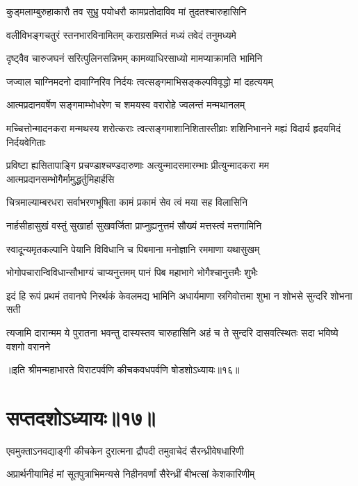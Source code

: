 \twolineshloka
{कुड्मलाम्बुरुहाकारौ तव सुभ्रु पयोधरौ}
{कामप्रतोदाविव मां तुदतश्चारुहासिनि}


\twolineshloka
{वलीविभङ्गचतुरं स्तनभारविनामितम्}
{कराग्रसम्मितं मध्यं तवेदं तनुमध्यमे}


\twolineshloka
{दृष्ट्वैव चारुजघनं सरित्पुलिनसन्निभम्}
{कामव्याधिरसाध्यो मामप्याक्रामति भामिनि}


\twolineshloka
{जज्वाल चाग्निमदनो दावाग्निरिव निर्दयः}
{त्वत्सङ्गमाभिसङ्कल्पविवृद्धो मां दहत्ययम्}


\twolineshloka
{आत्मप्रदानवर्षेण सङ्गमाम्भोधरेण च}
{शमयस्व वरारोहे ज्वलन्तं मन्मथानलम्}


\threelineshloka
{मच्चित्तोन्मादनकरा मन्मथस्य शरोत्कराः}
{त्वत्सङ्गमाशानिशितास्तीव्राः शशिनिभानने}
{मह्यं विदार्य हृदयमिदं निर्दयवेगिताः}


\threelineshloka
{प्रविष्टा ह्यसितापाङ्गि प्रचण्डाश्चण्डदारुणाः}
{अत्युन्मादसमारम्भाः प्रीत्युन्मादकरा मम}
{आत्मप्रदानसम्भोगैर्मामुद्धर्तुमिहार्हसि}


\twolineshloka
{चित्रमाल्याम्बरधरा सर्वाभरणभूषिता}
{कामं प्रकामं सेव त्वं मया सह विलासिनि}


\twolineshloka
{नार्हसीहासुखं वस्तुं सुखार्हा सुखवर्जिता}
{प्राप्नुह्यनुत्तमं सौख्यं मत्तस्त्वं मत्तगामिनि}


\twolineshloka
{स्वादून्यमृतकल्पानि पेयानि विविधानि च}
{पिबमाना मनोज्ञानि रममाणा यथासुखम्}


\twolineshloka
{भोगोपचारान्विविधान्सौभाग्यं चाप्यनुत्तमम्}
{पानं पिब महाभागे भोगैश्चानुत्तमैः शुभैः}


\fourlineindentedshloka
{इदं हि रूपं प्रथमं तवानघे}
{निरर्थकं केवलमद्य भामिनि}
{अधार्यमाणा स्रगिवोत्तमा शुभा}
{न शोभसे सुन्दरि शोभना सती}


\fourlineindentedshloka
{त्यजामि दारान्मम ये पुरातना}
{भवन्तु दास्यस्तव चारुहासिनि}
{अहं च ते सुन्दरि दासवत्स्थितः}
{सदा भविष्ये वशगो वरानने}

॥इति श्रीमन्महाभारते विराटपर्वणि कीचकवधपर्वणि षोडशोऽध्यायः॥१६॥

\chapter{सप्तदशोऽध्यायः॥१७॥}

\twolineshloka
{एवमुक्ताऽनवद्याङ्गी कीचकेन दुरात्मना}
{द्रौपदी तमुवाचेदं सैरन्ध्रीवेषधारिणी}


\twolineshloka
{अप्रार्थनीयामिहं मां सूतपुत्राभिमन्यसे}
{निहीनवर्णां सैरेन्ध्रीं बीभत्सां केशकारिणीम्}


